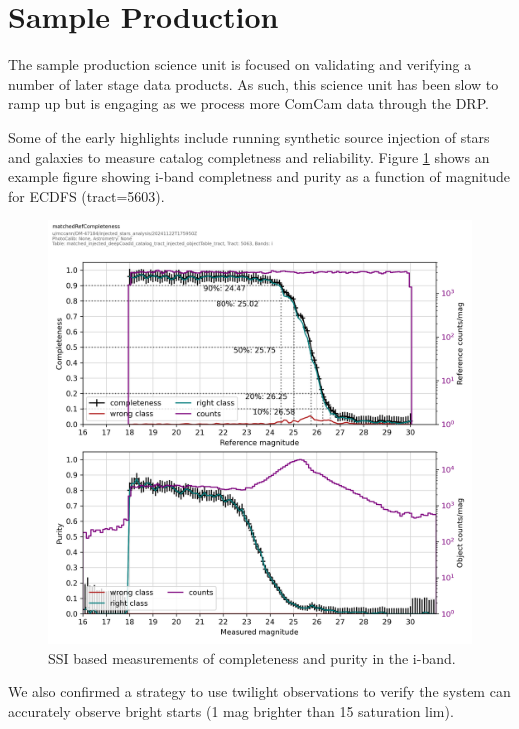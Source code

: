 \section{Sample Production}
\label{sec:sample_production}

The sample production science unit is focused on validating and verifying a number of later stage data products. 
As such, this science unit has been slow to ramp up but is engaging as we process more ComCam data through the DRP. 

Some of the early highlights include running synthetic source injection of stars and galaxies to measure catalog completness and reliability. 
Figure \ref{fig:ssi_comp} shows an example figure showing i-band completness and purity as a function of magnitude for ECDFS (tract=5603).
\begin{figure}
    \includegraphics{sample_production_figures/matched_ref_completness_ssi_i.png}
    \caption{SSI based measurements of completeness and purity in the i-band.}
    \label{fig:ssi_comp}
\end{figure}

We also confirmed a strategy to use twilight observations to verify the system can accurately observe bright starts (1 mag brighter than 15 saturation lim). 

  
  